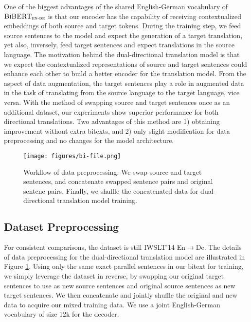 \documentclass[11pt]{article}
\begin{document}
One of the biggest advantages of the shared English-German vocabulary of $\textsc{BiBERT}_\textsc{en-de}$ is that our encoder has the capability of receiving contextualized embeddings of both source and target tokens. During the training step, we feed source sentences to the model and expect the generation of a target translation, yet also, inversely, feed target sentences and expect translations in the source language. The motivation behind the dual-directional translation model is that we expect the contextualized representations of source and target sentences could enhance each other to build a better encoder for the translation model. From the aspect of data augmentation, the target sentences play a role in augmented data in the task of translating from the source language to the target language, vice versa. With the method of swapping source and target sentences once as an additional dataset, our experiments show superior performance for both directional translations. Two advantages of this method are 1) obtaining improvement without extra bitexts, and 2) only slight modification for data preprocessing and no changes for the model architecture. 
\begin{figure}[t]
    \centering
    \texttt{[image: figures/bi-file.png]}
    \caption{Workflow of data preprocessing. We swap source and target sentences, and concatenate swapped sentence pairs and original sentene pairs. Finally, we shuffle the concatenated data for dual-directional translation model training.  }
    \label{fig:bi}
\end{figure}

\subsection{Dataset Preprocessing}
For consistent comparisons, the dataset is still IWSLT'14 En$\rightarrow$De. The details of data preprocessing for the dual-directional translation model are illustrated in Figure \ref{fig:bi}. Using only the same exact parallel sentences in our bitext for training, we simply leverage the dataset in reverse, by swapping our original target sentences to use as new source sentences and original source sentences as new target sentences. We then concatenate and jointly shuffle the original and new data to acquire our mixed training data. We use a joint English-German vocabulary of size 12k for the decoder. 
\end{document}
